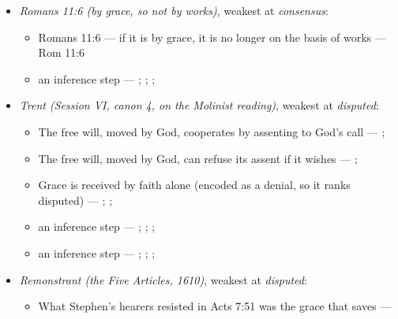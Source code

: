 \documentclass[11pt]{article}
\begin{document}
\begin{itemize}
\item \emph{Romans 11:6 (by grace, so not by works)}, weakest at \emph{consensus}:
\begin{itemize}
\item Romans 11:6 — if it is by grace, it is no longer on the basis of works --- Rom 11:6
\item an inference step --- \cite[Trent, Session VI (1547), ch. 8]{tanner-decrees-1990}; \cite[36]{waterworth-trent-1848}; \cite[Five Arminian Articles (1610), art. 4]{schaff-creeds-christendom-3-1977}; \cite[Canons of Dort, III/IV, art. 10]{schaff-creeds-christendom-3-1977}
\end{itemize}
\item \emph{Trent (Session VI, canon 4, on the Molinist reading)}, weakest at \emph{disputed}:
\begin{itemize}
\item The free will, moved by God, cooperates by assenting to God’s call --- \cite[Trent, Session VI (1547), canon 4]{tanner-decrees-1990}; \cite[45]{waterworth-trent-1848}
\item The free will, moved by God, can refuse its assent if it wishes --- \cite[Trent, Session VI (1547), canon 4]{tanner-decrees-1990}; \cite[45]{waterworth-trent-1848}
\item Grace is received by faith alone (encoded as a denial, so it ranks disputed) --- \cite[Augsburg Confession IV.1–3]{concordia-triglotta-1921}; \cite[Sermon 1, III.1]{wesley-sermons-1872}; \cite[Trent, Session VI (1547), canon 9]{tanner-decrees-1990}
\item an inference step --- \cite[I-II q.111 a.2]{aquinas-summa-1920}; \cite[Canons of Dort, III/IV, art. 12]{schaff-creeds-christendom-3-1977}; \cite[Trent, Session VI (1547), canon 4]{tanner-decrees-1990}; \cite[45]{waterworth-trent-1848}
\item an inference step --- \cite[I-II q.10 a.4 ad 3]{aquinas-summa-1920}; \cite[I-II q.112 a.3]{aquinas-summa-1920}; \cite[Trent, Session VI (1547), canon 4]{tanner-decrees-1990}; \cite[45]{waterworth-trent-1848}
\end{itemize}
\item \emph{Remonstrant (the Five Articles, 1610)}, weakest at \emph{disputed}:
\begin{itemize}
\item What Stephen’s hearers resisted in Acts 7:51 was the grace that saves --- \cite[Five Arminian Articles (1610), art. 4]{schaff-creeds-christendom-3-1977}

\end{itemize}
\end{itemize}
\end{document}

